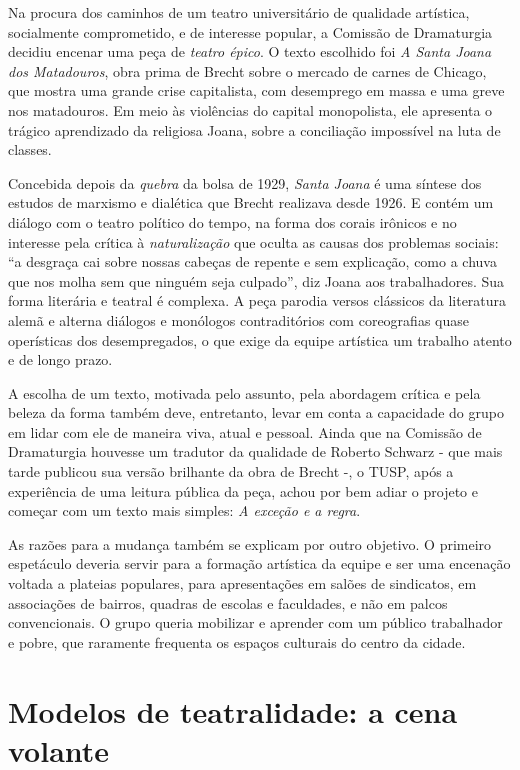 Na procura dos caminhos de um teatro universitário de qualidade
artística, socialmente comprometido, e de interesse popular, a Comissão
de Dramaturgia decidiu encenar uma peça de \textit{teatro épico}. O texto
escolhido foi \textit{A Santa Joana dos Matadouros}, obra prima de Brecht
sobre o mercado de carnes de Chicago, que mostra uma grande crise
capitalista, com desemprego em massa e uma greve nos matadouros. Em meio
às violências do capital monopolista, ele apresenta o trágico
aprendizado da religiosa Joana, sobre a conciliação impossível na luta
de classes.

Concebida depois da \textit{quebra} da bolsa de 1929, \textit{Santa Joana} é
uma síntese dos estudos de marxismo e dialética que Brecht realizava
desde 1926. E contém um diálogo com o teatro político do tempo, na forma
dos corais irônicos e no interesse pela crítica à \textit{naturalização}
que oculta as causas dos problemas sociais: “a desgraça cai sobre nossas
cabeças de repente e sem explicação, como a chuva que nos molha sem que
ninguém seja culpado”, diz Joana aos trabalhadores. Sua forma literária
e teatral é complexa. A peça parodia versos clássicos da literatura
alemã e alterna diálogos e monólogos contraditórios com coreografias
quase operísticas dos desempregados, o que exige da equipe artística um
trabalho atento e de longo prazo.

A escolha de um texto, motivada pelo assunto, pela abordagem crítica e
pela beleza da forma também deve, entretanto, levar em conta a
capacidade do grupo em lidar com ele de maneira viva, atual e pessoal.
Ainda que na Comissão de Dramaturgia houvesse um tradutor da qualidade
de Roberto Schwarz - que mais tarde publicou sua versão brilhante da
obra de Brecht -, o TUSP, após a experiência de uma leitura pública da
peça, achou por bem adiar o projeto e começar com um texto mais simples:
\textit{A exceção e a regra}.

As razões para a mudança também se explicam por outro objetivo. O
primeiro espetáculo deveria servir para a formação artística da equipe e
ser uma encenação voltada a plateias populares, para apresentações em
salões de sindicatos, em associações de bairros, quadras de escolas e
faculdades, e não em palcos convencionais. O grupo queria mobilizar e
aprender com um público trabalhador e pobre, que raramente frequenta os
espaços culturais do centro da cidade.

\section{Modelos de teatralidade: a cena volante}

